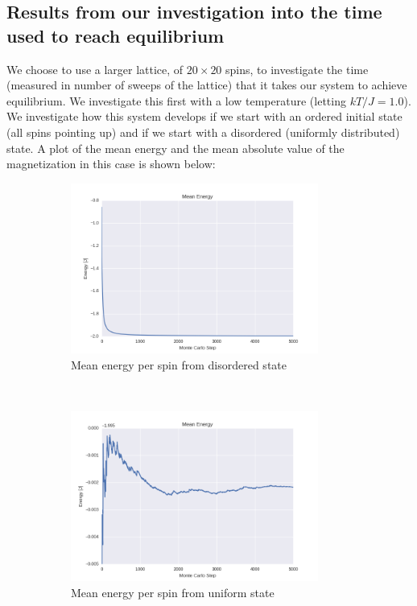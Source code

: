\documentclass[a4paper, 10pt]{article}
\begin{document}
\subsection{Results from our investigation into the time used to reach equilibrium}
We choose to use a larger lattice, of $20 \times 20$ spins, to investigate the time (measured in number of sweeps of the lattice) that it takes our system to achieve equilibrium. We investigate this first with a low temperature (letting $kT/J=1.0$). We investigate how this system develops if we start with an ordered initial state (all spins pointing up) and if we start with a disordered (uniformly distributed) state. A plot of the mean energy and the mean absolute value of the magnetization in this case is shown below:
\begin{figure}[!ht]
    \centering
    \begin{subfigure}[H!]{0.5\textwidth}
        \centering
        \includegraphics[height=2.2in]{meanEnergyWRandomStart.png}
        \caption{Mean energy per spin from disordered state}
    \end{subfigure}%
    ~ 
    \begin{subfigure}[H!]{0.5\textwidth}
        \centering
        \includegraphics[height=2.2in]{meanEnergyWUpStart.png}
        \caption{Mean energy per spin from uniform state}
    \end{subfigure}
        ~
     \begin{subfigure}[H!]{0.5\textwidth}

\end{subfigure}
\end{figure}
\end{document}
